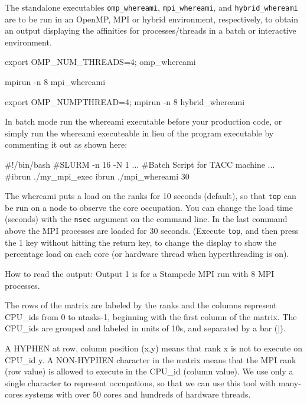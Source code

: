 \documentclass[10pt,a4paper]{report}
\begin{document}
The standalone executables \verb+omp_whereami+, \verb+mpi_whereami+, and \verb+hybrid_whereami+ are to
be run in an OpenMP, MPI or hybrid environment, respectively, to obtain an output
displaying the affinities for processes/threads in a batch or interactive environment.

\begin{code}[frame=single,breaklines=true,numbers=left,language=C,caption=Executables for evaluating OpenMP MPI and Hybrid masks\label{whereami}]
        export OMP_NUM_THREADS=4; omp_whereami
 
        mpirun -n 8  mpi_whereami
 
        export OMP_NUMPTHREAD=4; mpirun -n 8  hybrid_whereami
\end{code}
 
In batch mode run the whereami executable before your production code, or simply
run the whereami executeable in lieu of the program executable by commenting
it out as shown here:

\begin{code}[frame=single,breaklines=true,numbers=left,language=C,caption=Invoking mask report inside code\label{whereamimpi}]
        #!/bin/bash
        #SLURM  -n 16 -N 1
            ...
        #Batch Script for TACC machine
           ...
        #ibrun ./my_mpi_exec
         ibrun ./mpi_whereami 30
\end{code}

 The whereami puts a load on the ranks for 10 seconds (default), so that \verb+top+ can be run on
 a node to observe the core occupation. You can change the load time (seconds)
 with the \verb+nsec+ argument on the command line.  In the last command above the MPI processes are
 loaded for 30 seconds.  (Execute \verb+top+, and then press the
 1 key without hitting the return key, to change the display to show the percentage
 load on each core (or hardware thread when hyperthreading is on).


 How to read the output:
 Output 1 is for a Stampede MPI run with 8 MPI processes.

 The rows of the matrix are labeled by the ranks and the columns represent CPU\_ids
 from 0 to ntasks-1, beginning with the first column of the matrix.
 The CPU\_ids are grouped and labeled in units of 10s, and separated by a bar (|).

 A HYPHEN at row, column position (x,y) means that rank x is not to execute on CPU\_id y.
 A NON-HYPHEN character in the matrix means that
 the MPI rank (row value) is allowed to execute in the CPU\_id (column value).
 We use only a single  character to represent occupations, so that we can use
 this tool with many-cores systems with over 50 cores and hundreds of hardware threads.
\end{document}
